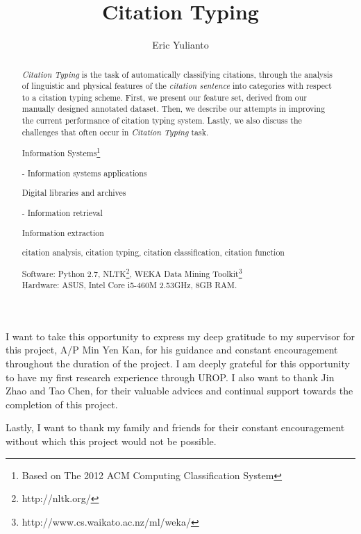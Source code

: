 \documentclass[urop]{socreport}
\theoremstyle{definition}
\begin{document}
\title{Citation Typing}
\author{Eric Yulianto}
\maketitle

\begin{abstract}
{\it Citation Typing} is the task of automatically classifying citations, through the analysis of linguistic and physical features of the {\it citation sentence} into categories with respect to a citation typing scheme. First, we present our feature set, derived from our manually designed annotated dataset. Then, we describe our attempts in improving the current performance of citation typing system. Lastly, we also discuss the challenges that often occur in {\it Citation Typing} task.

\begin{descriptors}
	\item Information Systems\footnote{Based on The 2012 ACM Computing Classification System}
	{\setlength\itemindent{30pt} \item - Information systems applications}
	{\setlength\itemindent{50pt} \item Digital libraries and archives}
	{\setlength\itemindent{30pt} \item - Information retrieval}
	{\setlength\itemindent{50pt} \item Information extraction}
\end{descriptors}
\begin{keywords}
	citation analysis, citation typing, citation classification, citation function
\end{keywords}
\begin{implement}
\begin{flushleft}
\hspace{5 mm}Software: Python 2.7, NLTK\footnote{http://nltk.org/}, WEKA Data Mining Toolkit\footnote{http://www.cs.waikato.ac.nz/ml/weka/} \nocite{hall2009weka}\\
\hspace{5 mm}Hardware: ASUS, Intel Core i5-460M 2.53GHz, 8GB RAM.
\end{flushleft}
\end{implement}

\end{abstract}

\begin{acknowledgement}
I want to take this opportunity to express my deep gratitude to my supervisor for this project, A/P Min Yen Kan, for his guidance and constant encouragement throughout the duration of the project. I am deeply grateful for this opportunity to have my first research experience through UROP. I also want to thank Jin Zhao and Tao Chen, for their valuable advices and continual support towards the completion of this project.

Lastly, I want to thank my family and friends for their constant encouragement without which this project would not be possible.
\end{acknowledgement}

\listoffigures

\tableofcontents









\end{document}
